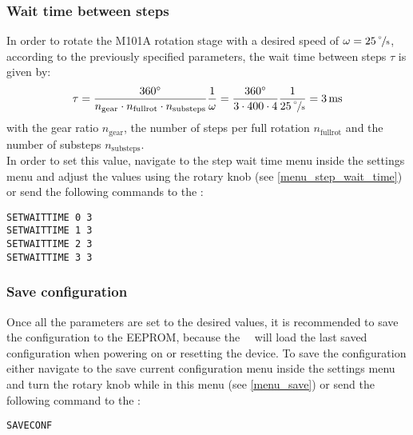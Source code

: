\subsubsection{Wait time between steps}
In order to rotate the M101A rotation stage with a desired speed of $\omega = \unit[25]{\nicefrac{^{\circ}}{s}}$, according to the previously specified parameters, the wait time between steps $\tau$ is given by:
\[
\tau = \frac{360^{\circ}}{n_{\textrm{gear}} \cdot n_{\textrm{fullrot}} \cdot n_{\textrm{substeps}}} \frac{1}{\omega} = \frac{360^{\circ}}{3 \cdot 400 \cdot 4} \frac{1}{\unit[25]{\nicefrac{^{\circ}}{s}}} =  \unit[3]{ms}
\]
with the gear ratio $n_{\textrm{gear}}$, the number of steps per full rotation $n_{\textrm{fullrot}}$ and the number of substeps $n_{\textrm{substeps}}$.\\
In order to set this value, navigate to the step wait time menu inside the settings menu and adjust the values using the rotary knob (see \ref{menu_step_wait_time}) or send the following commands to the \productName : 

\texttt{SETWAITTIME 0 3}\\
\texttt{SETWAITTIME 1 3}\\
\texttt{SETWAITTIME 2 3}\\
\texttt{SETWAITTIME 3 3}

\subsubsection{Save configuration}
Once all the parameters are set to the desired values, it is recommended to save the configuration to the EEPROM, because the \productNumber ~\productName ~will load the last saved configuration when powering on or resetting the device. To save the configuration either navigate to the save current configuration menu inside the settings menu and turn the rotary knob while in this menu (see \ref{menu_save}) or send the following command to the \productName : 

\texttt{SAVECONF}

